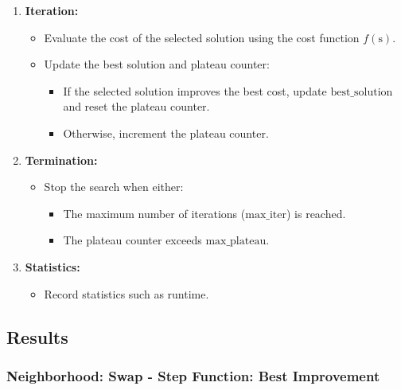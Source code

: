 \documentclass{article}
\begin{document}
\begin{enumerate}
    \item \textbf{Iteration:}
    \begin{itemize}
        \item Evaluate the cost of the selected solution using the cost function \( f(\text{s}) \).
        \item Update the best solution and plateau counter:
        \begin{itemize}
            \item If the selected solution improves the best cost, update \( \text{best\_solution} \) and reset the plateau counter.
            \item Otherwise, increment the plateau counter.
        \end{itemize}
    \end{itemize}
    
    \item \textbf{Termination:}
    \begin{itemize}
        \item Stop the search when either:
        \begin{itemize}
            \item The maximum number of iterations (\( \text{max\_iter} \)) is reached.
            \item The plateau counter exceeds \( \text{max\_plateau} \).
        \end{itemize}
    \end{itemize}
    
    \item \textbf{Statistics:}
    \begin{itemize}
        \item Record statistics such as runtime.
    \end{itemize}
\end{enumerate}

\subsection*{Results}

\subsubsection*{Neighborhood: Swap - Step Function: Best Improvement}
\end{document}
